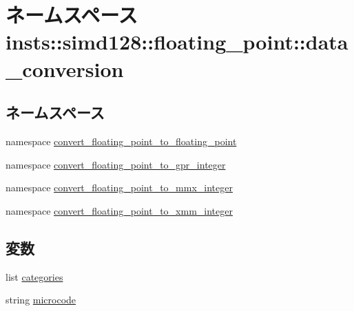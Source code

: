 \hypertarget{namespaceinsts_1_1simd128_1_1floating__point_1_1data__conversion}{
\section{ネームスペース insts::simd128::floating\_\-point::data\_\-conversion}
\label{namespaceinsts_1_1simd128_1_1floating__point_1_1data__conversion}
}
\subsection*{ネームスペース}
\begin{DoxyCompactItemize}
\item 
namespace \hyperlink{namespaceinsts_1_1simd128_1_1floating__point_1_1data__conversion_1_1convert__floating__point__to__floating__point}{convert\_\-floating\_\-point\_\-to\_\-floating\_\-point}
\item 
namespace \hyperlink{namespaceinsts_1_1simd128_1_1floating__point_1_1data__conversion_1_1convert__floating__point__to__gpr__integer}{convert\_\-floating\_\-point\_\-to\_\-gpr\_\-integer}
\item 
namespace \hyperlink{namespaceinsts_1_1simd128_1_1floating__point_1_1data__conversion_1_1convert__floating__point__to__mmx__integer}{convert\_\-floating\_\-point\_\-to\_\-mmx\_\-integer}
\item 
namespace \hyperlink{namespaceinsts_1_1simd128_1_1floating__point_1_1data__conversion_1_1convert__floating__point__to__xmm__integer}{convert\_\-floating\_\-point\_\-to\_\-xmm\_\-integer}
\end{DoxyCompactItemize}
\subsection*{変数}
\begin{DoxyCompactItemize}
\item 
list \hyperlink{namespaceinsts_1_1simd128_1_1floating__point_1_1data__conversion_a273cf0f1630af14c1582f05e53354a55}{categories}
\item 
string \hyperlink{namespaceinsts_1_1simd128_1_1floating__point_1_1data__conversion_a770f11a173e99389a8802f0107ed8f52}{microcode}
\end{DoxyCompactItemize}


